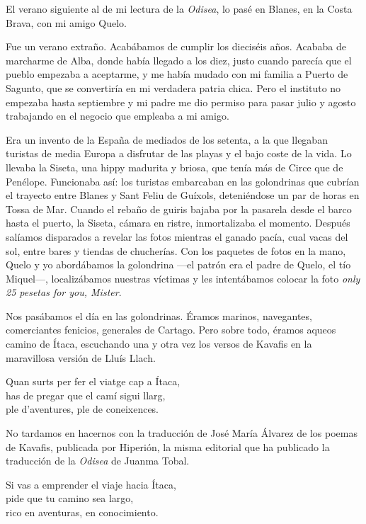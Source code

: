 \label{cap:marcharse}

El verano siguiente al de mi lectura de la \emph{Odisea}, lo pasé en Blanes, en la Costa Brava, con mi amigo Quelo.

Fue un verano extraño. Acabábamos de cumplir los dieciséis años. Acababa de marcharme de Alba, donde había llegado a los diez, justo cuando parecía que el pueblo empezaba a aceptarme, y me había mudado con mi familia a Puerto de Sagunto, que se convertiría en mi verdadera patria chica. Pero el instituto no empezaba hasta septiembre y mi padre me dio permiso para pasar julio y agosto trabajando en el negocio que empleaba a mi amigo.

Era un invento de la España de mediados de los setenta, a la que llegaban turistas de media Europa a disfrutar de las playas y el bajo coste de la vida. Lo llevaba la Siseta, una hippy madurita y briosa, que tenía más de Circe que de Penélope. Funcionaba así: los turistas embarcaban en las golondrinas que cubrían el trayecto entre Blanes y Sant Feliu de Guíxols, deteniéndose un par de horas en Tossa de Mar. Cuando el rebaño de guiris bajaba por la pasarela desde el barco hasta el puerto, la Siseta, cámara en ristre, inmortalizaba el momento. Después salíamos disparados a revelar las fotos mientras el ganado pacía, cual vacas del sol, entre bares y tiendas de chucherías. Con los paquetes de fotos en la mano, Quelo y yo abordábamos la golondrina ---el patrón era el padre de Quelo, el tío Miquel---, localizábamos nuestras víctimas y les intentábamos colocar la foto \emph{only 25 pesetas for you, Mister}.

Nos pasábamos el día en las golondrinas. Éramos marinos, navegantes, comerciantes fenicios, generales de Cartago. Pero sobre todo, éramos aqueos camino de Ítaca, escuchando una y otra vez los versos de Kavafis en la maravillosa versión de Lluís Llach.

\begin{versocita}
Quan surts per fer el viatge cap a Ítaca,\\
has de pregar que el camí sigui llarg,\\
ple d'aventures, ple de coneixences.
\end{versocita}

No tardamos en hacernos con la traducción de José María Álvarez de los poemas de Kavafis, publicada por Hiperión, la misma editorial que ha publicado la traducción de la \emph{Odisea} de Juanma Tobal.

\begin{versocita}
Si vas a emprender el viaje hacia Ítaca,\\
pide que tu camino sea largo,\\
rico en aventuras, en conocimiento.
\end{versocita}


